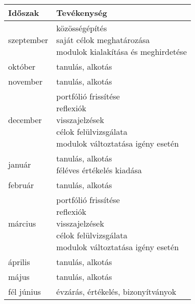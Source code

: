 \begin{longtable}[]{LM}
\renewcommand{\arraystretch}{1.5}
\textbf{Időszak} & \textbf{Tevékenység}\tabularnewline
\hline
\endhead
szeptember & {közösségépítés\\
saját célok meghatározása\\
modulok kialakítása és meghirdetése}\tabularnewline
\hline
október & tanulás, alkotás\tabularnewline
\hline
november & tanulás, alkotás\tabularnewline
\hline
december & {portfólió frissítése\\
reflexiók\\
visszajelzések\\
célok felülvizsgálata\\
modulok változtatása igény esetén}\tabularnewline
\hline
január & {tanulás, alkotás\\
féléves értékelés kiadása}\tabularnewline
\hline
február & tanulás, alkotás\tabularnewline
\hline
március & {portfólió frissítése\\
reflexiók\\
visszajelzések\\
célok felülvizsgálata\\
modulok változtatása igény esetén}\tabularnewline
\hline
április & tanulás, alkotás\tabularnewline
\hline
május & tanulás, alkotás\tabularnewline
\hline
fél június & évzárás, értékelés, bizonyítványok\tabularnewline
\end{longtable}

